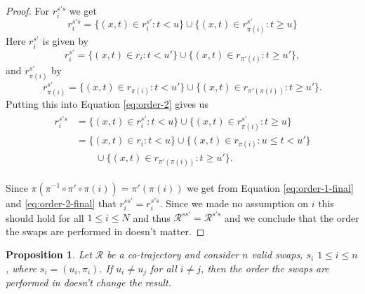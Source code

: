 \documentclass[12pt]{article}
\newcommand{\traj}{r}
\newcommand{\cotraj}{\mathcal{R}}
\newcommand{\swap}{s}
\newcommand{\swaptime}{u}
\newtheorem{proposition}{Proposition}
\theoremstyle{definition}
\begin{document}
\begin{proof}
  For \(\traj^{\swap'\swap}_{i}\) we get
  \begin{equation}
    \label{eq:order-2}
    \traj^{\swap'\swap}_{i} = \{(x, t) \in \traj^{\swap'}_{i}: t < u\}
    \cup \{(x, t) \in \traj^{\swap'}_{\pi(i)}: t \geq u\}
  \end{equation}
  Here \(\traj^{\swap'}_{i}\) is given by
  \begin{equation*}
    \traj^{\swap'}_{i} = \{(x, t) \in \traj_{i}: t < u'\}
    \cup \{(x, t) \in \traj_{\pi'(i)}: t \geq u'\},
  \end{equation*}
  and \(\traj^{\swap'}_{\pi(i)}\) by
  \begin{equation*}
    \traj^{\swap'}_{\pi(i)} = \{(x, t) \in \traj_{\pi(i)}: t < u'\}
    \cup \{(x, t) \in \traj_{\pi'(\pi(i))}: t \geq u'\}.
  \end{equation*}
  Putting this into Equation \ref{eq:order-2} gives us
  \begin{align}
    \begin{split}
      \label{eq:order-2-final}
      \traj^{\swap'\swap}_{i} &= \{(x, t) \in \traj^{\swap'}_{i}: t < u\}
      \cup \{(x, t) \in \traj^{\swap'}_{\pi(i)}: t \geq u\}\\
      &= \{(x, t) \in \traj_{i}: t < u\}
      \cup \{(x, t) \in \traj_{\pi(i)}: u \leq t < u'\}\\
      &\qquad \cup \{(x, t) \in \traj_{\pi'(\pi(i))}: t \geq u'\}.
    \end{split}
  \end{align}

  Since \(\pi(\pi^{-1} \circ \pi' \circ \pi(i)) = \pi'(\pi(i))\) we
  get from Equation \ref{eq:order-1-final} and \ref{eq:order-2-final}
  that \(\traj^{\swap\swap'}_{i} = \traj^{\swap'\swap}_{i}\). Since we
  made no assumption on \(i\) this should hold for all
  \(1 \leq i \leq N\) and thus
  \(\cotraj^{\swap\swap'} = \cotraj^{\swap'\swap}\) and we conclude
  that the order the swaps are performed in doesn't matter.
\end{proof}

\begin{proposition}
  \label{prop:swap-order}
  Let \(\cotraj\) be a co-trajectory and consider \(n\) valid swaps,
  \(\swap_{i}\) \(1 \leq i \leq n\), where
  \(\swap_{i} = (\swaptime_{i}, \pi_{i})\). If
  \(\swaptime_{i} \not= \swaptime_{j}\) for all \(i \not= j\), then
  the order the swaps are performed in doesn't change the result.
\end{proposition}
\end{document}
